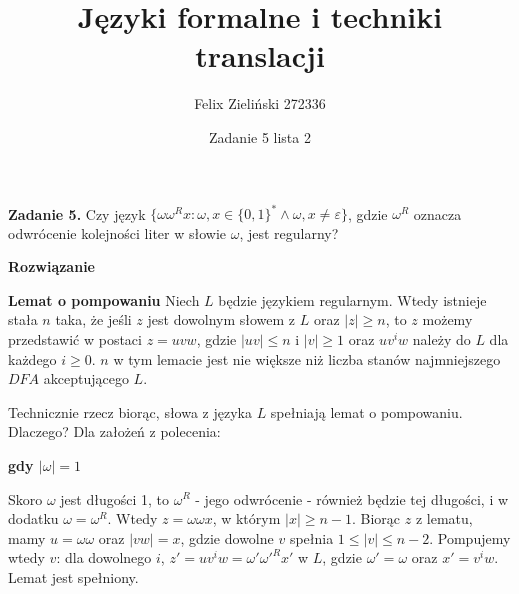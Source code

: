 \documentclass[15pt, a4paper]{article}
\title{Języki formalne i techniki translacji}
\author{Felix Zieliński 272336}
\date{Zadanie 5 lista 2}
\begin{document}
\maketitle

\vspace{0.5cm}

\noindent\hrulefill


\vspace{0.5cm}

\noindent\textbf{Zadanie 5.} Czy język \( \{ \omega \omega^R x : \omega, x \in \{0,1\}^* \land \omega, x \neq \varepsilon \} \), gdzie \( \omega^R \) oznacza odwrócenie kolejności liter w słowie \( \omega \), jest regularny?

\vspace{0.5cm}

\noindent\textbf{Rozwiązanie}

\vspace{0.5cm}

\noindent \textbf{Lemat o pompowaniu}
Niech \(L\) będzie językiem regularnym. Wtedy istnieje stała \(n\) taka, że jeśli \(z\) jest dowolnym słowem z \(L\) oraz \(|z| \geq n\), to \(z\) możemy przedstawić w postaci \(z = uvw\), gdzie \(|uv| \leq n\) i \(|v| \geq 1\) oraz \(uv^{i}w\) należy do \(L\) dla każdego \(i \geq 0\).
\(n\) w tym lemacie jest nie większe niż liczba stanów najmniejszego \(DFA\) akceptującego \(L\).

\vspace{0.5cm}

\noindent Technicznie rzecz biorąc, słowa z języka \(L\) spełniają lemat o pompowaniu. Dlaczego? Dla założeń z polecenia:

\vspace{0.5cm}

\noindent \textbf{gdy \(|\omega| =  1\)}  

\vspace{0.5cm}

\noindent Skoro \(\omega\) jest długości 1, to \(\omega^R\) - jego odwrócenie - również będzie tej długości, i w dodatku \(\omega = \omega^R\). Wtedy \( z = \omega \omega x \), w którym \( |x| \geq n - 1\). Biorąc \(z\) z lematu, mamy \(u = \omega \omega\) oraz \( |vw| = x \), gdzie dowolne \(v \) spełnia \( 1 \leq |v| \leq n-2 \). Pompujemy wtedy \( v \): dla dowolnego \( i \), \( z' = uv^i w = \omega' \omega'^R x' \) w \( L \), gdzie \( \omega' = \omega \) oraz \( x' = v^iw \). Lemat jest spełniony. 

\vspace{0.5cm}
\end{document}
